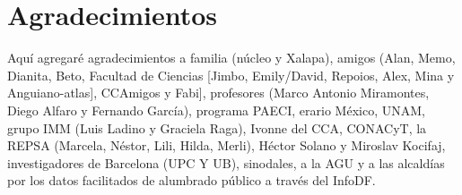 \chapter{Agradecimientos}


Aquí agregaré agradecimientos a familia (núcleo y Xalapa), amigos (Alan, Memo, Dianita, Beto, Facultad de Ciencias [Jimbo, Emily/David, Repoios, Alex, Mina y Anguiano-atlas], CCAmigos y Fabi], profesores (Marco Antonio Miramontes, Diego Alfaro y Fernando García), programa PAECI, erario México, UNAM, grupo IMM (Luis Ladino y Graciela Raga), Ivonne del CCA, CONACyT, la REPSA (Marcela, Néstor, Lili, Hilda, Merli), Héctor Solano y Miroslav Kocifaj, investigadores de Barcelona (UPC Y UB), sinodales, a la AGU y a las alcaldías por los datos facilitados de alumbrado público a través del InfoDF.







